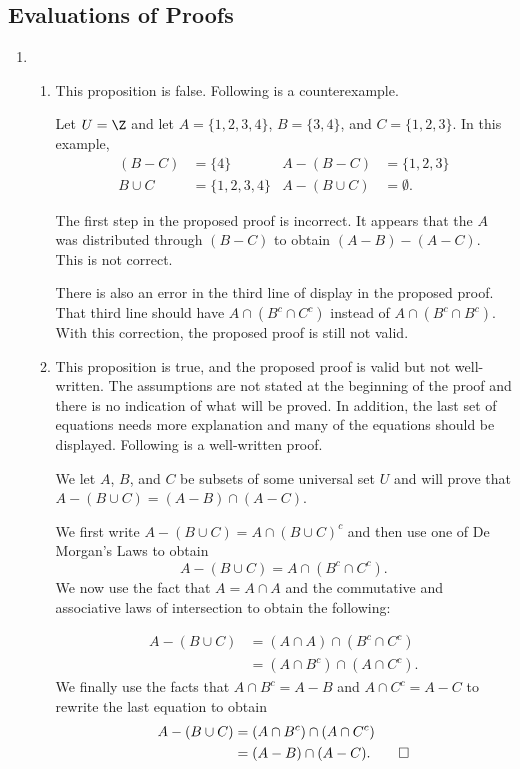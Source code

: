 \subsection*{Evaluations of Proofs}
\setcounter{oldenumi}{\theenumi}
\begin{enumerate} \setcounter{enumi}{\theoldenumi}
\item \begin{enumerate}
\item This proposition is false.  Following is a counterexample.

\vskip6pt
\noindent
Let $U = \Z$ and let $A = \{1, 2, 3, 4 \}$, $B = \{3, 4 \}$, and $C = \{1, 2, 3\}$.  In this example,
\begin{align*}
(B - C) &= \{4 \} & A - (B - C) &= \{1, 2, 3 \} \\
B \cup C &= \{1, 2, 3, 4 \}  &  A - (B \cup C) &= \emptyset.
\end{align*}


\vskip6pt
\noindent
The first step in the proposed proof is incorrect.  It appears that the $A$ was distributed through $(B - C)$ to obtain $(A - B) - (A - C)$.  This is not correct.

\vskip6pt
\noindent
There is also an error in the third line of display in the proposed proof.  That third line should have $A \cap (B^c \cap C^c)$ instead of $A \cap (B^c \cap B^c)$.  With this correction, the proposed proof is still not valid.

\item This proposition is true, and the proposed proof is valid but not well-written.  The assumptions are not stated at the beginning of the proof and there is no indication of what will be proved.  In addition, the last set of equations needs more explanation and many of the equations should be displayed.  Following is a well-written proof.

\begin{myproof}
We let $A$, $B$, and $C$ be subsets of some universal set $U$ and will prove that 
$A - \left(B \cup C \right) = \left(A - B \right) \cap \left(A - C \right)$.

We first write $A - \left(B \cup C \right) = A \cap \left(B \cup C \right)^c$ and then use one of De Morgan's Laws to obtain
\[ 
A - \left(B \cup C \right)= A \cap \left(B^c \cap C^c \right).
\]
We now use the fact that $A = A \cap A$ and the commutative and  associative laws of intersection to obtain the following:

\begin{align*}
A - \left(B \cup C \right) &= (A \cap A) \cap (B^c \cap C^c) \\ 
                           &= \left(A \cap B^c \right) \cap \left(A \cap C^c \right).
\end{align*}
We finally use the facts that $A \cap B^c = A - B$ and $A \cap C^c = A - C$ to rewrite the last equation to obtain
\begin{align*}
A - \left(B \cup C \right) &= \left(A \cap B^c \right) \cap \left(A \cap C^c \right) \\
                           &= (A - B) \cap (A - C). \qedhere
\end{align*}
\end{myproof}


\end{enumerate}
\end{enumerate}
